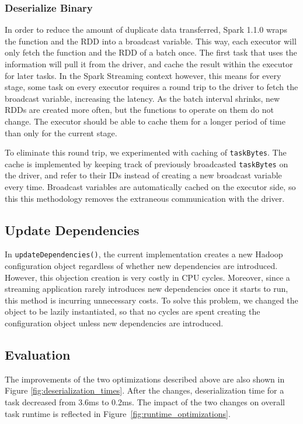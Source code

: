 \subsubsection{Deserialize Binary}
In order to reduce the amount of duplicate data transferred, Spark 1.1.0 wraps the function and the RDD into a broadcast variable. This way, each executor will only fetch the function and the RDD of a batch once. The first task that uses the information will pull it from the driver, and cache the result within the executor for later tasks. In the Spark Streaming context however, this means for every stage, some task on every executor requires a round trip to the driver to fetch the broadcast variable, increasing the latency. As the batch interval shrinks, new RDDs are created more often, but the functions to operate on them do not change. The executor should be able to cache them for a longer period of time than only for the current stage.

To eliminate this round trip, we experimented with caching of \texttt{taskBytes}. The cache is implemented by keeping track of previously broadcasted \texttt{taskBytes} on the driver, and refer to their IDs instead of creating a new broadcast variable every time. Broadcast variables are automatically cached on the executor side, so this this methodology removes the extraneous communication with the driver.

\subsection{Update Dependencies}
In \texttt{updateDependencies()}, the current implementation creates a new Hadoop configuration object regardless of whether new dependencies are introduced. However, this objection creation is very costly in CPU cycles. Moreover, since a streaming application rarely introduces new dependencies once it starts to run, this method is incurring unnecessary costs. To solve this problem, we changed the object to be lazily instantiated, so that no cycles are spent creating the configuration object unless new dependencies are introduced.

\subsection{Evaluation}
The improvements of the two optimizations described above are also shown in Figure \ref{fig:deserialization_times}. After the changes, deserialization time for a task decreased from 3.6ms to 0.2ms. The impact of the two changes on overall task runtime is reflected in Figure~\ref{fig:runtime_optimizations}.

